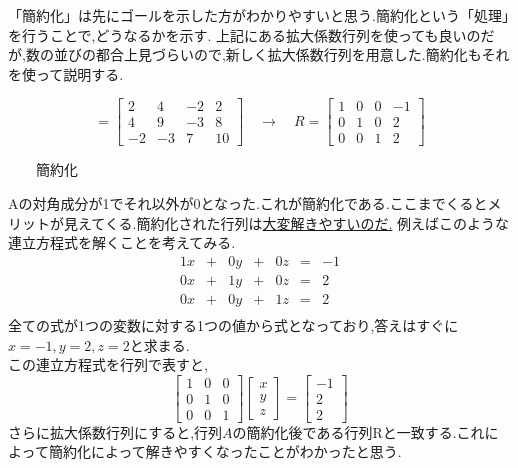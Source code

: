 「簡約化」は先にゴールを示した方がわかりやすいと思う.簡約化という「処理」を行うことで,どうなるかを示す.
上記にある拡大係数行列を使っても良いのだが,数の並びの都合上見づらいので,新しく拡大係数行列を用意した.簡約化もそれを使って説明する.
\begin{framed}
\begin{equation}    
[\,A \:\:\symbfit{b}\,]=
\begin{bmatrix}
    2& 4 & -2 & 2 \\
    4 & 9 & -3 & 8 \\
    -2 & -3 & 7 & 10
\end{bmatrix}
\quad\rightarrow\quad R=
\begin{bmatrix}
    1& 0 & 0 & -1 \\
    0 & 1 & 0 & 2 \\
    0 & 0 & 1 & 2
\end{bmatrix}\label{eq:ex_gaussian_A}
\end{equation}
\begin{center}
    　　簡約化\\
\end{center}
\vspace{-4mm}
\end{framed}
Aの対角成分が1でそれ以外が0となった.これが簡約化である.ここまでくるとメリットが見えてくる.簡約化された行列は\underline{大変解きやすいのだ.}
例えばこのような連立方程式を解くことを考えてみる.
\[
\begin{array}{ccccccc}
    1x & + &0y & +&0z &= &-1 \\
   0x & +&1y & +&0z &= &2 \\
   0x & + &0y & +&1z &= &2 \\
\end{array}
\]
全ての式が1つの変数に対する1つの値から式となっており,答えはすぐに$x=-1,y=2,z=2$と求まる.\\
この連立方程式を行列で表すと,
\begin{equation}\label{eq:solableByRREF}
\begin{bmatrix}
    1& 0 & 0 \\
    0 & 1 & 0 \\
    0 & 0 & 1 
\end{bmatrix}
\begin{bmatrix}
    x \\ y \\ z
\end{bmatrix}
=
\begin{bmatrix}
    −1 \\ 2 \\ 2
\end{bmatrix}
\end{equation}
さらに拡大係数行列にすると,行列$A$の簡約化後である行列Rと一致する.これによって簡約化によって解きやすくなったことがわかったと思う.

